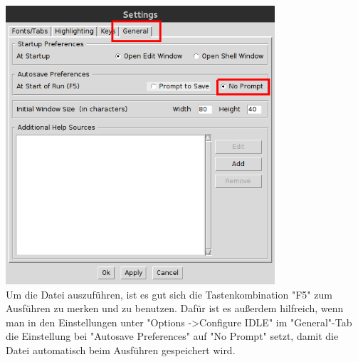 \documentclass[ngerman,oneside, a4letter]{article}
\begin{document}
\includegraphics[width=100mm]{bilder/auto_save}
\\
Um die Datei auszuführen, ist es gut sich die Tastenkombination "F5" zum Ausführen zu merken und zu benutzen. Dafür ist es außerdem hilfreich, wenn man in den Einstellungen unter "Options -\textgreater Configure IDLE" im "General"-Tab die Einstellung bei "Autosave Preferences" auf "No Prompt" setzt, damit die Datei automatisch beim Ausführen gespeichert wird.
\end{document}
